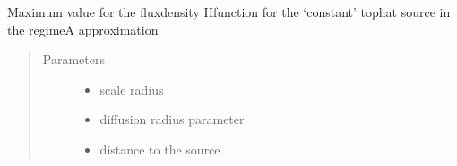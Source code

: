 \documentclass[letterpaper,10pt,english]{sphinxmanual}
\begin{document}
\begin{fulllineitems}
\label{\detokenize{diffsph.profiles:diffsph.profiles.analytics.cofdAmax}}
\sphinxAtStartPar
Maximum value for the flux\sphinxhyphen{}density H\sphinxhyphen{}function for the ‘constant’ top\sphinxhyphen{}hat source in the regime\sphinxhyphen{}A approximation
\begin{quote}\begin{description}
\item[{Parameters}] \leavevmode\begin{itemize}
\item {} 
\sphinxAtStartPar
{} \textendash{} scale radius

\item {} 
\sphinxAtStartPar
{} \textendash{} diffusion radius parameter

\item {} 
\sphinxAtStartPar
{} \textendash{} distance to the source

\end{itemize}

\end{description}\end{quote}

\end{fulllineitems}

\end{document}
